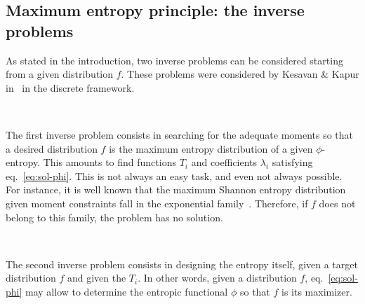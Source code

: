 \documentclass[entropy,article,submit,moreauthors,pdftex]{Definitions/mdpi}
\begin{document}
\subsection{Maximum entropy principle: the inverse problems}

As stated in  the introduction, two inverse problems can  be considered starting
from a  given distribution  $f$. These  problems were  considered by  Kesavan \&
Kapur in~\cite{KesKap89} in the discrete framework.

\

The first inverse problem consists in searching for the adequate moments so that
a  desired distribution  $f$  is the  maximum entropy  distribution  of a  given
$\phi$-entropy.   This   amounts  to  find  functions   $T_i$  and  coefficients
$\lambda_i$ satisfying eq.~\eqref{eq:sol-phi}.  This is not always an easy task,
and even not  always possible. For instance,  it is well known  that the maximum
Shannon entropy  distribution given moment  constraints fall in  the exponential
family~\cite{CovTho06, BorLew91:05, Arn01, MezMon09}. Therefore, if $f$ does not
belong to this family, the problem has no solution.


\

The second  inverse problem consists  in designing  the entropy itself,  given a
target  distribution  $f$  and  given  the  $T_i$.   In  other  words,  given  a
distribution  $f$, eq.~\eqref{eq:sol-phi}  may allow  to determine  the entropic
functional $\phi$ so that $f$ is its maximizer.
\end{document}

